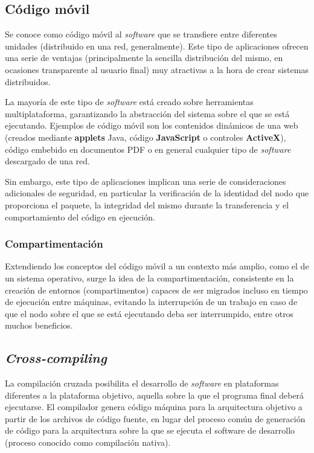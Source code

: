 \subsection{Código móvil}
\label{teoria:codigomovil}

Se conoce como código móvil al \textit{software} que se transfiere entre diferentes unidades (distribuido en una red, generalmente). Este tipo de aplicaciones ofrecen una serie de ventajas (principalmente la sencilla distribución del mismo, en ocasiones transparente al usuario final) muy atractivas a la hora de crear sistemas distribuidos.

La mayoría de este tipo de \textit{software} está creado sobre herramientas multiplataforma, garantizando la abstracción del sistema sobre el que se está ejecutando. Ejemplos de código móvil son los contenidos dinámicos de una web (creados mediante \textbf{applets} Java, código \textbf{JavaScript} o controles \textbf{ActiveX}), código embebido en documentos PDF o en general cualquier tipo de \textit{software} descargado de una red.

Sin embargo, este tipo de aplicaciones implican una serie de consideraciones adicionales de seguridad, en particular la verificación de la identidad del nodo que proporciona el paquete, la integridad del mismo durante la transferencia y el comportamiento del código en ejecución.

\subsubsection{Compartimentación}

Extendiendo los conceptos del código móvil a un contexto más amplio, como el de un sistema operativo, surge la idea de la compartimentación, consistente en la creación de entornos (compartimentos) capaces de ser migrados incluso en tiempo de ejecución entre máquinas, evitando la interrupción de un trabajo en caso de que el nodo sobre el que se está ejecutando deba ser interrumpido, entre otros muchos beneficios.

\subsection{\textit{Cross-compiling}}

La compilación cruzada posibilita el desarrollo de \textit{software} en plataformas diferentes a la plataforma objetivo, aquella sobre la que el programa final deberá ejecutarse. El compilador genera código máquina para la arquitectura objetivo a partir de los archivos de código fuente, en lugar del proceso común de generación de código para la arquitectura sobre la que se ejecuta el software de desarrollo (proceso conocido como compilación nativa).


